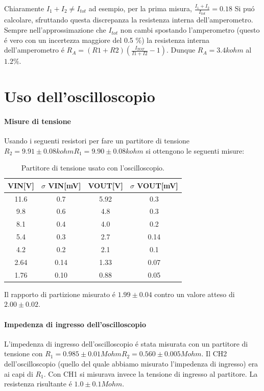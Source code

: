 \documentclass[10pt,a4paper]{article}
\begin{document}
Chiaramente $I_1+I_2\neq I_{tot}$ ad esempio, per la prima misura, $\frac{I_1+I_2}{I_{tot}}=0.18$
Si pu\'o calcolare, sfruttando questa discrepanza la resistenza interna dell'amperometro. Sempre nell'approssimazione che $I_{tot}$ non cambi spostando l'amperometro (questo \'e vero con un incertezza maggiore del 0.5 \%) la resistenza interna dell'amperometro \'e $R_A = (R1+R2)\left(\frac{I_{TOT}}{I1+I2} - 1 \right)$. Dunque $R_A=3.4 kohm$ al $1.2 \%$.



\section{Uso dell'oscilloscopio}

\paragraph{Misure di tensione}
Usando i seguenti resistori per fare un partitore di tensione $ 
R_2=9.91\pm 0.08 kohm
R_1=9.90\pm 0.08 kohm$
si ottengono le seguenti misure:
\begin{table}[h]
\centering
\begin{tabular}{|c|c|c|c|}
\hline 
VIN[V]& $\sigma$ VIN[mV] &VOUT[V]	 & $\sigma$ VOUT[mV] \\
\hline 
11.6 & 0.7 & 5.92 & 0.3 \\
9.8 & 0.6 & 4.8 & 0.3 \\
8.1 & 0.4 & 4.0 & 0.2 \\
5.4 & 0.3 & 2.7 & 0.14 \\
4.2 & 0.2 & 2.1 & 0.1 \\
2.64 & 0.14 & 1.33 & 0.07 \\
1.76 & 0.10 & 0.88 & 0.05 \\
\hline 
\end{tabular} 
\caption{Partitore di tensione usato con l'oscilloscopio.\label{t:par1}}
\end{table}
Il rapporto di partizione misurato \'e $1.99\pm 0.04 $ contro un valore atteso di $2.00 \pm 0.02$.


\paragraph{Impedenza di ingresso dell'oscilloscopio}
L'impedenza di ingresso dell'oscilloscopio \'e stata misurata con un partitore di tensione con $R_1=0.985\pm 0.01 Mohm R_2=0.560\pm 0.005 Mohm$. Il CH2 dell'oscilloscopio (quello del quale abbiamo misurato l'impedenza di ingresso) era ai capi di $R_1$. Con CH1 si misurava invece la tensione di ingresso al partitore.
La resistenza risultante \'e $1.0 \pm 0.1 Mohm$.  
\end{document}
